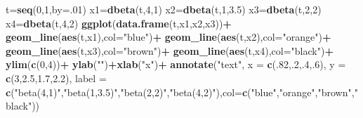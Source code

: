 \documentclass[
]{book}
\newenvironment{Shaded}{\begin{snugshade}}{\end{snugshade}}
\newcommand{\AttributeTok}[1]{\textcolor[rgb]{0.13,0.29,0.53}{#1}}
\newcommand{\DecValTok}[1]{\textcolor[rgb]{0.00,0.00,0.81}{#1}}
\newcommand{\FloatTok}[1]{\textcolor[rgb]{0.00,0.00,0.81}{#1}}
\newcommand{\FunctionTok}[1]{\textcolor[rgb]{0.13,0.29,0.53}{\textbf{#1}}}
\newcommand{\NormalTok}[1]{#1}
\newcommand{\OtherTok}[1]{\textcolor[rgb]{0.56,0.35,0.01}{#1}}
\newcommand{\SpecialCharTok}[1]{\textcolor[rgb]{0.81,0.36,0.00}{\textbf{#1}}}
\newcommand{\StringTok}[1]{\textcolor[rgb]{0.31,0.60,0.02}{#1}}
\theoremstyle{definition}
\theoremstyle{definition}
\theoremstyle{definition}
\theoremstyle{definition}
\theoremstyle{remark}
\begin{document}
\begin{Shaded}
\begin{Highlighting}[]
\NormalTok{t}\OtherTok{=}\FunctionTok{seq}\NormalTok{(}\DecValTok{0}\NormalTok{,}\DecValTok{1}\NormalTok{,}\AttributeTok{by=}\NormalTok{.}\DecValTok{01}\NormalTok{)}
\NormalTok{x1}\OtherTok{=}\FunctionTok{dbeta}\NormalTok{(t,}\DecValTok{4}\NormalTok{,}\DecValTok{1}\NormalTok{)}
\NormalTok{x2}\OtherTok{=}\FunctionTok{dbeta}\NormalTok{(t,}\DecValTok{1}\NormalTok{,}\FloatTok{3.5}\NormalTok{)}
\NormalTok{x3}\OtherTok{=}\FunctionTok{dbeta}\NormalTok{(t,}\DecValTok{2}\NormalTok{,}\DecValTok{2}\NormalTok{)}
\NormalTok{x4}\OtherTok{=}\FunctionTok{dbeta}\NormalTok{(t,}\DecValTok{4}\NormalTok{,}\DecValTok{2}\NormalTok{)}
\FunctionTok{ggplot}\NormalTok{(}\FunctionTok{data.frame}\NormalTok{(t,x1,x2,x3))}\SpecialCharTok{+}
  \FunctionTok{geom\_line}\NormalTok{(}\FunctionTok{aes}\NormalTok{(t,x1),}\AttributeTok{col=}\StringTok{"blue"}\NormalTok{)}\SpecialCharTok{+}
  \FunctionTok{geom\_line}\NormalTok{(}\FunctionTok{aes}\NormalTok{(t,x2),}\AttributeTok{col=}\StringTok{"orange"}\NormalTok{)}\SpecialCharTok{+}
  \FunctionTok{geom\_line}\NormalTok{(}\FunctionTok{aes}\NormalTok{(t,x3),}\AttributeTok{col=}\StringTok{"brown"}\NormalTok{)}\SpecialCharTok{+}
  \FunctionTok{geom\_line}\NormalTok{(}\FunctionTok{aes}\NormalTok{(t,x4),}\AttributeTok{col=}\StringTok{"black"}\NormalTok{)}\SpecialCharTok{+}
  \FunctionTok{ylim}\NormalTok{(}\FunctionTok{c}\NormalTok{(}\DecValTok{0}\NormalTok{,}\DecValTok{4}\NormalTok{))}\SpecialCharTok{+}
  \FunctionTok{ylab}\NormalTok{(}\StringTok{""}\NormalTok{)}\SpecialCharTok{+}\FunctionTok{xlab}\NormalTok{(}\StringTok{"x"}\NormalTok{)}\SpecialCharTok{+}
  \FunctionTok{annotate}\NormalTok{(}\StringTok{"text"}\NormalTok{, }\AttributeTok{x =} \FunctionTok{c}\NormalTok{(.}\DecValTok{82}\NormalTok{,.}\DecValTok{2}\NormalTok{,.}\DecValTok{4}\NormalTok{,.}\DecValTok{6}\NormalTok{), }\AttributeTok{y =} \FunctionTok{c}\NormalTok{(}\DecValTok{3}\NormalTok{,}\FloatTok{2.5}\NormalTok{,}\FloatTok{1.7}\NormalTok{,}\FloatTok{2.2}\NormalTok{), }\AttributeTok{label =} \FunctionTok{c}\NormalTok{(}\StringTok{"beta(4,1)"}\NormalTok{,}\StringTok{"beta(1,3.5)"}\NormalTok{,}\StringTok{"beta(2,2)"}\NormalTok{,}\StringTok{"beta(4,2)"}\NormalTok{),}\AttributeTok{col=}\FunctionTok{c}\NormalTok{(}\StringTok{"blue"}\NormalTok{,}\StringTok{"orange"}\NormalTok{,}\StringTok{"brown"}\NormalTok{,}\StringTok{"black"}\NormalTok{))}
\end{Highlighting}
\end{Shaded}
\end{document}
